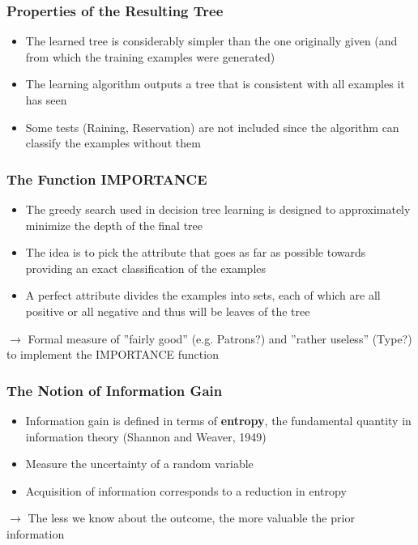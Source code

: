 \documentclass[conference]{styles/acmsiggraph}
\begin{document}
        \subsubsection{Properties of the Resulting Tree}
            \begin{itemize}
                \item The learned tree is considerably simpler than the one originally given (and from which the training examples were generated)
                \item The learning algorithm outputs a tree that is consistent with all examples it has seen
                \item Some tests (Raining, Reservation) are not included since the algorithm can classify the examples without them
            \end{itemize}
    
    
    
    
    
        \subsubsection{The Function IMPORTANCE}
            \begin{itemize}
                \item The greedy search used in decision tree learning is designed to approximately minimize the depth of the final tree
                \item The idea is to pick the attribute that goes as far as possible towards providing an exact classification of the examples
                \item A perfect attribute divides the examples into sets, each of which are all positive or all negative and thus will be leaves of the tree
            \end{itemize}
            $\rightarrow$ Formal measure of ''fairly good'' (e.g. Patrons?) and ''rather useless'' (Type?) to implement the IMPORTANCE function
        
        \subsubsection{The Notion of Information Gain}
            \begin{itemize}
                \item Information gain is defined in terms of \textbf{entropy}, the fundamental quantity in information theory (Shannon and Weaver, 1949)
                \item Measure the uncertainty of a random variable
                \item Acquisition of information corresponds to a reduction in entropy
            \end{itemize}
            $\rightarrow$ The less we know about the outcome, the more valuable the prior information
        
\end{document}

